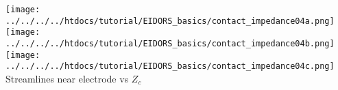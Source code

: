 \documentclass[portrait,final,a0paper,fontscale=0.277]{baposter}
\begin{document}
\begin{poster}
{\begin{center}
\vspace{ 3mm}
\texttt{[image: ../../../../htdocs/tutorial/EIDORS\_basics/contact\_impedance04a.png]}%
\texttt{[image: ../../../../htdocs/tutorial/EIDORS\_basics/contact\_impedance04b.png]}%
\texttt{[image: ../../../../htdocs/tutorial/EIDORS\_basics/contact\_impedance04c.png]}%
\\
Streamlines near electrode vs $Z_c$
\end{center}
}

\end{poster}
\end{document}
